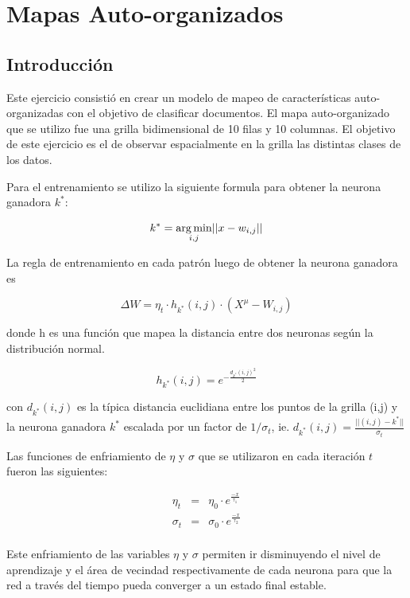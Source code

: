 \section{Mapas Auto-organizados }

\subsection{Introducción}
Este ejercicio consistió en crear un modelo de mapeo de características
auto-organizadas con el objetivo de clasificar documentos. El mapa
auto-organizado que se utilizo fue una grilla bidimensional de 10 filas y 10
columnas. El objetivo de este ejercicio es el de observar espacialmente en la
grilla las distintas clases de los datos.

Para el entrenamiento se utilizo la siguiente formula para obtener la neurona
ganadora $k^*$:

  \[
  k^* = \operatorname*{arg\,min}_{i,j} \lvert\lvert x-w_{i,j} \rvert\rvert
  \]

La regla de entrenamiento en cada patrón luego de obtener la neurona ganadora
es

\begin{equation}
	\Delta W = \eta_t \cdot h_{k^*}(i,j) \cdot (X^{\mu}-W_{i,j})
\end{equation}

donde h es una función que mapea la distancia entre dos neuronas según la
distribución normal.

\[
	h_{k^*}(i, j) = e^{-\frac{d_{k^*}(i,j)^2}{2}}
\]

con $d_{k^*}(i,j)$ es la típica distancia euclidiana entre los puntos de la
grilla (i,j) y la neurona ganadora $k^*$ escalada por un factor de
$1/\sigma_t$, ie.  $ d_{k^*}(i,j) = \frac{\lvert \lvert (i,j)-k^* \rvert
\rvert}{\sigma_t} $

Las funciones de enfriamiento de $\eta$ y $\sigma$ que se utilizaron en cada
iteración $t$ fueron las siguientes:

\[
  \begin{array}{ccc}
    \eta_t & = & \eta_0 \cdot e^{\frac{-x}{\tau_1}} \\
    \sigma_t & = & \sigma_0 \cdot e^{\frac{-x}{\tau_2}} \\
  \end{array}
\]

Este enfriamiento de las variables $\eta$ y $\sigma$ permiten ir disminuyendo
el nivel de aprendizaje y el área de vecindad respectivamente de cada neurona
para que la red a través del tiempo pueda converger a un estado final estable.


